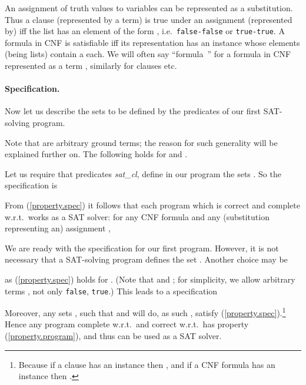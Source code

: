 \documentclass{tlp}
\begin{document}
An assignment of truth values to variables can be represented as a substitution.
Thus a clause (represented by a term)  is true under an assignment (represented
by)  iff the list  
has an element of the form  , i.e.\ 
{\tt false-false} or {\tt true-true}.  A formula in CNF is satisfiable
iff
its representation has an instance whose
elements (being lists) contain a   each.
We will often say ``formula~\/'' for a formula in CNF represented as a
term , similarly for clauses etc.



\paragraph{Specification.}
Now let us describe the sets to be defined by the predicates of our first 
SAT-solving program.  

Note that  are arbitrary ground terms; the reason for
such generality will be explained further on.
The following holds for  and .

Let us require that predicates {\it sat\_cl},  define
in our program the sets .
So the specification is 

From  (\ref{property.spec}) it follows that each program
which is correct and complete w.r.t.\  works as a SAT solver:
for any CNF formula  and any (substitution representing an) assignment
,





We are ready with the specification for our first program.
However, it is not necessary that a SAT-solving program defines the set .
Another choice may be

as (\ref{property.spec}) holds for .
(Note that   and ;
for simplicity, we allow arbitrary terms , not only 
{\tt false}, {\tt true}.)
This leads to a specification
  
Moreover, any sets 
,  such that 
and  will do,
as such ,  satisfy (\ref{property.spec}).\footnote{Because
   if a clause  has an instance  then ,
   and
   if a CNF formula  has an instance  then .
} Hence any program complete w.r.t.\  and correct w.r.t.\  has
property (\ref{property.program}), and thus can be used as a SAT solver.
\end{document}
